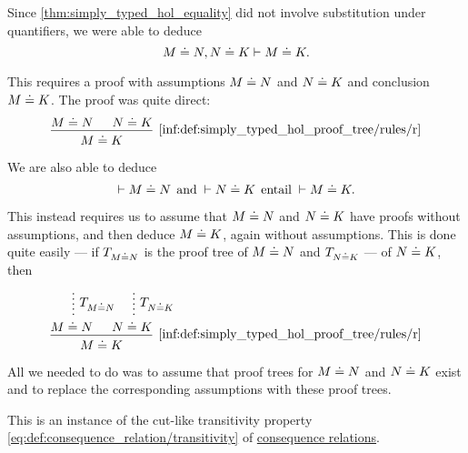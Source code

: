 \begin{remark}\label{rem:simply_typed_hol_syntactic_metalogical_consequence}
  Since \cref{thm:simply_typed_hol_equality} did not involve substitution under quantifiers, we were able to deduce
  \begin{equation*}
    M \doteq N, N \doteq K \vdash M \doteq K.
  \end{equation*}

  This requires a proof with assumptions \( M \doteq N \) and \( N \doteq K \) and conclusion \( M \doteq K \). The proof was quite direct:
  \begin{equation*}
    \begin{prooftree}
      \hypo{ M \syneq N }
      \hypo{ N \syneq K }
      \infer2[\ref{inf:def:simply_typed_hol_proof_tree/rules/r}]{ M \syneq K }
    \end{prooftree}
  \end{equation*}

  We are also able to deduce
  \begin{equation*}
    \vdash M \syneq N \thinspace \T{and} {}\vdash N \syneq K \thinspace \T{entail} {}\vdash M \syneq K.
  \end{equation*}

  This instead requires us to assume that \( M \doteq N \) and \( N \doteq K \) have proofs without assumptions, and then deduce \( M \doteq K \), again without assumptions. This is done quite easily --- if \( T_{M \doteq N} \) is the proof tree of \( M \doteq N \) and \( T_{N \doteq K} \) --- of \( N \doteq K \), then
  \begin{equation*}
    \begin{prooftree}
      \hypo{}
      \ellipsis { \( T_{M \syneq N} \) } { M \syneq N }

      \hypo{}
      \ellipsis { \( T_{N \syneq K} \) } { N \syneq K }

      \infer2[\ref{inf:def:simply_typed_hol_proof_tree/rules/r}]{ M \syneq K }
    \end{prooftree}
  \end{equation*}

  All we needed to do was to assume that proof trees for \( M \doteq N \) and \( N \doteq K \) exist and to replace the corresponding assumptions with these proof trees.

  This is an instance of the cut-like transitivity property \eqref{eq:def:consequence_relation/transitivity} of \hyperref[def:consequence_relation]{consequence relations}.


\end{remark}
